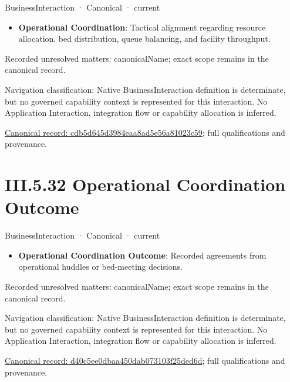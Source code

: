 \label{element:cdb5d645d3984eaa8ad5e56a81023c59}
{\small BusinessInteraction · Canonical · current}\par

\begin{itemize}


\item \textbf{Operational Coordination}: Tactical alignment regarding resource allocation, bed distribution, queue balancing, and facility throughput.

\end{itemize}

{\small Recorded unresolved matters: canonicalName; exact scope remains in the canonical record.}\par
{\small Navigation classification: Native BusinessInteraction definition is determinate, but no governed capability context is represented for this interaction. No Application Interaction, integration flow or capability allocation is inferred.}\par
{\footnotesize \href{../../../../continuum/business/business-interaction/cdb5d645d3984eaa8ad5e56a81023c59.md}{Canonical record: cdb5d645d3984eaa8ad5e56a81023c59}; full qualifications and provenance.}\par
\section*{III.5.32 Operational Coordination Outcome}
\label{navigation:III.5.32}

\label{element:d40c5ee0dbaa450dab073103f25ded6d}
{\small BusinessInteraction · Canonical · current}\par

\begin{itemize}


\item \textbf{Operational Coordination Outcome}: Recorded agreements from operational huddles or bed-meeting decisions.

\end{itemize}

{\small Recorded unresolved matters: canonicalName; exact scope remains in the canonical record.}\par
{\small Navigation classification: Native BusinessInteraction definition is determinate, but no governed capability context is represented for this interaction. No Application Interaction, integration flow or capability allocation is inferred.}\par
{\footnotesize \href{../../../../continuum/business/business-interaction/d40c5ee0dbaa450dab073103f25ded6d.md}{Canonical record: d40c5ee0dbaa450dab073103f25ded6d}; full qualifications and provenance.}\par
